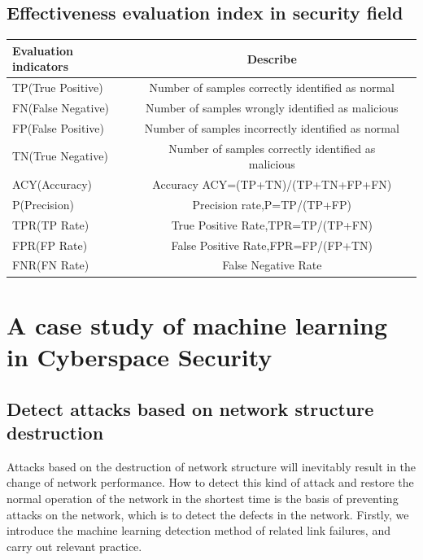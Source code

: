 \documentclass[UTF8]{article}
\begin{document}
\subsection{Effectiveness evaluation index in security field \cite{10}}

\begin{center}

 \begin{tabular}{lcl}

  \toprule[2pt]
  
{\bfseries Evaluation indicators} & {\bfseries Describe} \\
  \midrule
TP(True Positive) & Number of samples correctly identified as normal \\
FN(False Negative) & Number of samples wrongly identified as malicious \\
FP(False Positive) & Number of samples incorrectly identified as normal\\
TN(True Negative) & Number of samples correctly identified as malicious \\


ACY(Accuracy) & Accuracy ACY=(TP+TN)/(TP+TN+FP+FN)\\
P(Precision) & Precision rate,P=TP/(TP+FP) \\
TPR(TP Rate) & True Positive Rate,TPR=TP/(TP+FN)\\
FPR(FP Rate) & False Positive Rate,FPR=FP/(FP+TN) \\
FNR(FN Rate) & False Negative Rate\\
  \bottomrule[2pt]
 \end{tabular}
\end{center}

\section{A case study of machine learning in Cyberspace Security}



\subsection{ Detect attacks based on network structure destruction }


Attacks based on the destruction of network structure will inevitably result in the change of network performance. How to detect this kind of attack and restore the normal operation of the network in the shortest time is the basis of preventing attacks on the network, which is to detect the defects in the network.\cite{13} Firstly, we introduce the machine learning detection method of related link failures, and carry out relevant practice.
\end{document}
